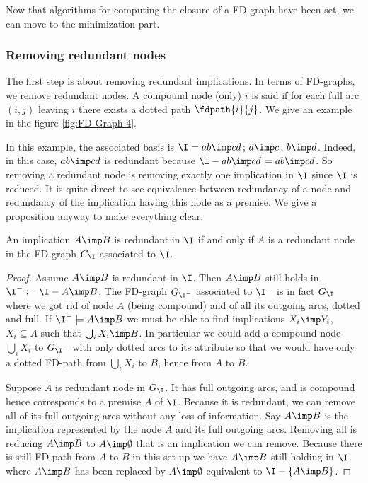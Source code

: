 \vspace{1.2em}

Now that algorithms for computing the closure of a FD-graph have been set, we
can move to the minimization part.

\subsubsection{Removing redundant nodes}

The first step is about removing redundant implications. In terms of FD-graphs, 
we remove redundant nodes. A compound node (only) $i$ is said  if for each full arc $(i, j)$ leaving $i$
there exists a dotted path $\fdpath{i}{j}$. We give an example in the figure
\ref{fig:FD-Graph-4}.

\begin{figure}[ht]

\end{figure}

In this example, the associated basis is $\I = { ab \imp cd \, ; \, a \imp c \, ; \, b \imp d}$. Indeed, in this case, $ab \imp cd$ is 
redundant because $\I - {ab \imp cd} \models ab \imp cd$. So removing a redundant node is removing exactly one implication in $\I$ since $\I$ is reduced. It is quite direct to see equivalence between redundancy of a node and
redundancy of the implication having this node as a premise. We give a 
proposition anyway to make everything clear.

\begin{proposition} An implication $A \imp B$ is redundant in $\I$ if and only if $A$ is a redundant node in the FD-graph $G_{\I}$ associated to $\I$.
\end{proposition}

\begin{proof} Assume $A \imp B$ is redundant in $\I$. Then $A \imp B$ still holds in $\I^{-} := \I - {A \imp B}$. The FD-graph $G_{\I^{-}}$ associated to 
$\I^{-}$ is in fact $G_{\I}$ where we got rid of node $A$ (being compound) and
of all its outgoing arcs, dotted and full. If $\I^{-} \models A \imp B$ we must be able to find implications $X_i \imp Y_i$, $X_i \subseteq A$ such that $\bigcup_{i} X_i \imp B$. In particular we could add a compound node $\bigcup_i X_i$ to $G_{\I^{-}}$ with only dotted arcs to its attribute so that
we would have only a dotted FD-path from $\bigcup_i X_i$ to $B$, hence from $A$
to $B$.

\vspace{1.2em}

Suppose $A$ is redundant node in $G_{\I}$. It has full outgoing arcs, and is
compound hence corresponds to a premise $A$ of $\I$. Because it is redundant, we
can remove all of its full outgoing arcs without any loss of information. Say
$A \imp B$ is the implication represented by the node $A$ and its full outgoing
arcs. Removing all is reducing $A \imp B$ to $A \imp \emptyset$ that is an
implication we can remove. Because there is still FD-path from $A$ to $B$ in this set up we have $A \imp B$ still holding in $\I$ where $A \imp B$ has been
replaced by $A \imp \emptyset$ equivalent to $\I - \{ A \imp B \}$.

\end{proof}

